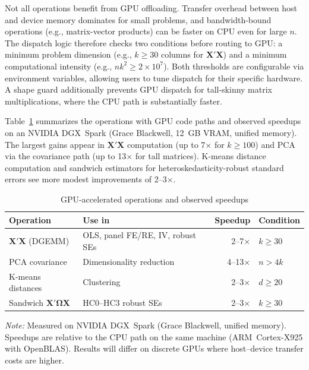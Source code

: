 Not all operations benefit from GPU offloading. Transfer overhead
between host and device memory dominates for small problems, and
bandwidth-bound operations (e.g., matrix-vector products) can be
faster on CPU even for large $n$. The dispatch logic therefore checks
two conditions before routing to GPU: a minimum problem dimension
(e.g., $k \geq 30$ columns for $\bm{X}'\bm{X}$) and a minimum
computational intensity (e.g., $nk^2 \geq 2 \times 10^7$). Both
thresholds are configurable via environment variables, allowing
users to tune dispatch for their specific hardware. A shape guard
additionally prevents GPU dispatch for tall-skinny matrix
multiplications, where the CPU path is substantially faster.

Table~\ref{tab:gpu-ops} summarizes the operations with GPU code paths
and observed speedups on an NVIDIA DGX~Spark (Grace Blackwell, 12~GB
VRAM, unified memory). The largest gains appear in $\bm{X}'\bm{X}$
computation (up to 7$\times$ for $k \geq 100$) and PCA via the
covariance path (up to 13$\times$ for tall matrices). K-means distance
computation and sandwich estimators for heteroskedasticity-robust
standard errors see more modest improvements of 2--3$\times$.

\begin{table}[htbp]
\centering
\begin{threeparttable}
\caption{GPU-accelerated operations and observed speedups}
\label{tab:gpu-ops}
\small
\begin{tabular}{lp{4.7cm}rl}
\toprule
Operation & Use in & Speedup & Condition \\
\midrule
$\bm{X}'\bm{X}$ (DGEMM) & OLS, panel FE/RE, IV, robust SEs & 2--7$\times$ & $k \geq 30$ \\
PCA covariance & Dimensionality reduction & 4--13$\times$ & $n > 4k$ \\
K-means distances & Clustering & 2--3$\times$ & $d \geq 20$ \\
Sandwich $\bm{X}'\bm{\Omega X}$ & HC0--HC3 robust SEs & 2--3$\times$ & $k \geq 30$ \\
\bottomrule
\end{tabular}
\begin{tablenotes}[flushleft]
\item \emph{Note:} Measured on NVIDIA DGX~Spark (Grace Blackwell, unified
memory). Speedups are relative to the CPU path on the same machine
(ARM~Cortex-X925 with OpenBLAS). Results will differ on discrete GPUs
where host--device transfer costs are higher.
\end{tablenotes}
\end{threeparttable}
\end{table}

